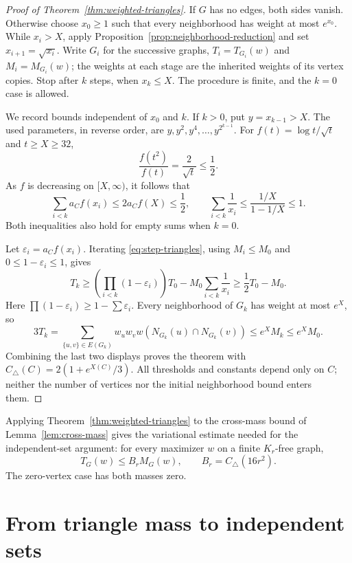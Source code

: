 \documentclass[11pt]{article}
\theoremstyle{definition}
\theoremstyle{remark}
\numberwithin{equation}{section}
\begin{document}
\begin{proof}[Proof of Theorem~\ref{thm:weighted-triangles}]
If $G$ has no edges, both sides vanish. Otherwise choose $x_0\ge1$
such that every neighborhood has weight at most $e^{x_0}$. While
$x_i>X$, apply Proposition~\ref{prop:neighborhood-reduction} and
set $x_{i+1}=\sqrt{x_i}$. Write $G_i$ for the successive graphs,
$T_i=T_{G_i}(w)$ and $M_i=M_{G_i}(w)$; the weights at each stage
are the inherited weights of its vertex copies. Stop after $k$ steps,
when $x_k\le X$. The procedure is finite, and the $k=0$ case is
allowed.

We record bounds independent of $x_0$ and $k$. If $k>0$, put
$y=x_{k-1}>X$. The used parameters, in reverse order, are
$y,y^2,y^4,\ldots,y^{2^{k-1}}$. For
$f(t)=\log t/\sqrt t$ and $t\ge X\ge32$,
\[
 \frac{f(t^2)}{f(t)}=\frac2{\sqrt t}\le\frac12.
\]
As $f$ is decreasing on $[X,\infty)$, it follows that
\begin{equation}\label{eq:summable-losses}
 \sum_{i<k}a_Cf(x_i)\le2a_Cf(X)\le\frac12,
 \qquad
 \sum_{i<k}\frac1{x_i}\le\frac{1/X}{1-1/X}\le1.
\end{equation}
Both inequalities also hold for empty sums when $k=0$.

Let $\varepsilon_i=a_Cf(x_i)$. Iterating
\eqref{eq:step-triangles}, using $M_i\le M_0$ and
$0\le1-\varepsilon_i\le1$, gives
\[
 T_k\ge\left(\prod_{i<k}(1-\varepsilon_i)\right)T_0
          -M_0\sum_{i<k}\frac1{x_i}
 \ge\frac12T_0-M_0.
\]
Here $\prod(1-\varepsilon_i)\ge1-\sum\varepsilon_i$.
Every neighborhood of $G_k$ has weight at most $e^X$, so
\[
 3T_k
 =\sum_{\{u,v\}\in E(G_k)}w_uw_vw(N_{G_k}(u)\cap N_{G_k}(v))
 \le e^X M_k\le e^X M_0.
\]
Combining the last two displays proves the theorem with
$C_\triangle(C)=2(1+e^{X(C)}/3)$. All
thresholds and constants depend only on $C$; neither the number of
vertices nor the initial neighborhood bound enters them.
\end{proof}


Applying Theorem~\ref{thm:weighted-triangles} to the cross-mass bound
of Lemma~\ref{lem:cross-mass} gives the variational estimate needed
for the independent-set argument: for every maximizer $w$ on a finite
$K_r$-free graph,
\begin{equation}\label{eq:optimizer-triangle}
 T_G(w)\le B_r M_G(w),\qquad B_r=C_{\triangle}(16r^2).
\end{equation}
The zero-vertex case has both masses zero.

\section{From triangle mass to independent sets}
\label{sec:closure}
\end{document}
